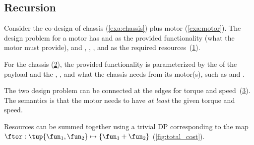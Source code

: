 \subsection{Recursion}

\begin{example}
    \label{exa:chassis_plus_motor}
    Consider the co-design of chassis (\cref{exa:chassis}) plus motor (\cref{exa:motor}).
    The design problem for a motor has  and  as the provided functionality (what the motor must provide), and , , , and  as the required resources~(\cref{fig:motor}).
    
    \begin{figure}[h!]
        \centering
        \caption{}
        \label{fig:motor}
    \end{figure}
    
    
    For the chassis (\cref{fig:gmcdp_chassis}), the provided functionality is parameterized by the  of the payload and the , , and what the chassis needs from its motor(s), such as  and .
    
    \begin{figure}[h!]
        \centering
        \caption{}
        \label{fig:gmcdp_chassis}
    \end{figure}
    
    
    The two design problem can be connected at the edges for torque and speed~(\cref{fig:gmcdp_chassis_plus_motor_series}).
    The semantics is that the motor needs to have \emph{at least} the given torque and speed.
    
    
    \begin{figure}[h!]
        \centering
        \caption{}
        \label{fig:gmcdp_chassis_plus_motor_series}
    \end{figure}
    
    Resources can be summed together using a trivial DP corresponding
    to the map $\ftor:\tup{\fun_{1},\fun_{2}} \mapsto\{\fun_{1}+\fun_{2}\}$
    (\cref{fig:total_cost}).
    

\end{example}
